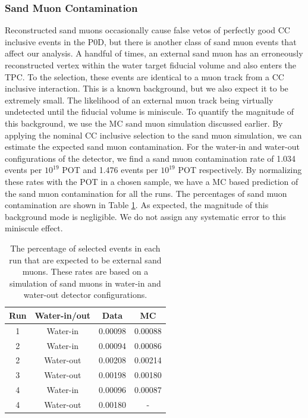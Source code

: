 \subsubsection{Sand Muon Contamination}

Reconstructed sand muons occasionally cause false vetos of perfectly good CC inclusive events in the P0D, but there is another class of sand muon events that affect our analysis. A handful of times, an external sand muon has an erroneously reconstructed vertex within the water target fiducial volume and also enters the TPC. To the selection, these events are identical to a muon track from a CC inclusive interaction. This is a known background, but we also expect it to be extremely small. The likelihood of an external muon track being virtually undetected until the fiducial volume is miniscule. To quantify the magnitude of this background, we use the MC sand muon simulation discussed earlier. By applying the nominal CC inclusive selection to the sand muon simulation, we can estimate the expected sand muon contamination. For the water-in and water-out configurations of the detector, we find a sand muon contamination rate of 1.034 events per $10^{19}$ POT and 1.476 events per $10^{19}$ POT respectively. By normalizing these rates with the POT in a chosen sample, we have a MC based prediction of the sand muon contamination for all the runs. The percentages of sand muon contamination are shown in Table \ref{tab:sandcont}. As expected, the magnitude of this background mode is negligible. We do not assign any systematic error to this miniscule effect.

\begin{table}[h]
\caption{The percentage of selected events in each run that are expected to be external sand muons. These rates are based on a simulation of sand muons in water-in and water-out detector configurations.}
\label{tab:sandcont}
\centering
\begin{tabular}{cccc}
\toprule
Run & Water-in/out & Data & MC \\
\midrule
1 & Water-in & 0.00098 & 0.00088\\
2 & Water-in & 0.00094 & 0.00086\\
2 & Water-out & 0.00208 & 0.00214\\
3 & Water-out & 0.00198 & 0.00180\\
4 & Water-in & 0.00096 & 0.00087\\
4 & Water-out & 0.00180 & - \\
\bottomrule
\end{tabular}
\end{table}

